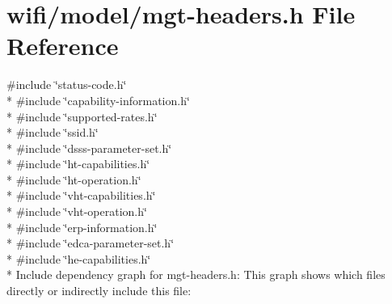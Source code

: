 \hypertarget{mgt-headers_8h}{}\section{wifi/model/mgt-\/headers.h File Reference}
\label{mgt-headers_8h}
{\ttfamily \#include \char`\"{}status-\/code.\+h\char`\"{}}\\*
{\ttfamily \#include \char`\"{}capability-\/information.\+h\char`\"{}}\\*
{\ttfamily \#include \char`\"{}supported-\/rates.\+h\char`\"{}}\\*
{\ttfamily \#include \char`\"{}ssid.\+h\char`\"{}}\\*
{\ttfamily \#include \char`\"{}dsss-\/parameter-\/set.\+h\char`\"{}}\\*
{\ttfamily \#include \char`\"{}ht-\/capabilities.\+h\char`\"{}}\\*
{\ttfamily \#include \char`\"{}ht-\/operation.\+h\char`\"{}}\\*
{\ttfamily \#include \char`\"{}vht-\/capabilities.\+h\char`\"{}}\\*
{\ttfamily \#include \char`\"{}vht-\/operation.\+h\char`\"{}}\\*
{\ttfamily \#include \char`\"{}erp-\/information.\+h\char`\"{}}\\*
{\ttfamily \#include \char`\"{}edca-\/parameter-\/set.\+h\char`\"{}}\\*
{\ttfamily \#include \char`\"{}he-\/capabilities.\+h\char`\"{}}\\*
Include dependency graph for mgt-\/headers.h\+:
This graph shows which files directly or indirectly include this file\+:
